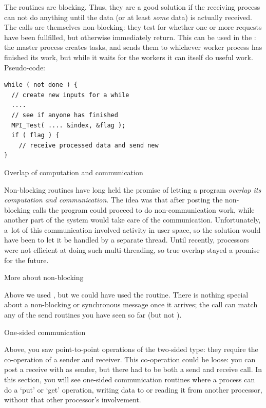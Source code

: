 The  routines are blocking. Thus, they are a good solution if 
the receiving process can not do anything until the data 
(or at least \emph{some} data) is actually received.
The  calls are themselves non-blocking: they
test for whether one or more requests have been
fullfilled, but otherwise immediately return.
This can be used in the
: the master process creates tasks, and
sends them to whichever worker process has finished its work,
but while it waits for the workers it can itself do useful work.
Pseudo-code:
\begin{verbatim}
while ( not done ) {
  // create new inputs for a while
  ....
  // see if anyone has finished
  MPI_Test( .... &index, &flag );
  if ( flag ) {
    // receive processed data and send new
}
\end{verbatim}

 {Overlap of computation and communication}

Non-blocking routines have long held the promise of letting a
program \emph{overlap its computation and
communication}.  The
idea was that after posting the non-blocking calls the program could
proceed to do non-communication work, while another part of the system
would take care of the communication. Unfortunately, a~lot of this 
communication involved activity in user space, so the solution would have
been to let it be handled by a separate thread. Until recently, processors
were not efficient at doing such multi-threading, so true overlap 
stayed a promise for the future.

 {More about non-blocking}

Above we used , but we could have used the 
routine.  There is nothing special about a non-blocking or synchronous
message once it arrives; the  call can match any of the
send routines you have seen so far (but not ).

 {One-sided communication}

Above, you saw  point-to-point operations of the two-sided type:
they require the co-operation of a sender and
receiver. This co-operation could be loose: you can post a receive
with  as sender, but there had to be both a send and
receive call. In this section, you will see one-sided communication 
routines where a process
can do a `put' or `get' operation, writing data to or reading it from
another processor, without that other processor's involvement.

